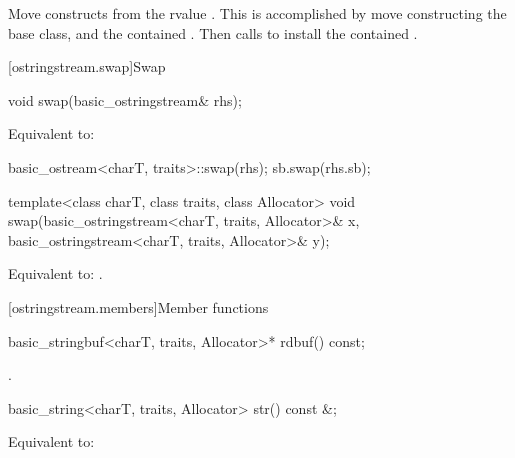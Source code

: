 \begin{itemdescr}
\pnum
\effects
Move constructs from the rvalue . This
is accomplished by move constructing the base class, and the contained
.
Then calls 
to install the contained .
\end{itemdescr}

[ostringstream.swap]{Swap}

%
\begin{itemdecl}
void swap(basic_ostringstream& rhs);
\end{itemdecl}

\begin{itemdescr}
\pnum
\effects
Equivalent to:
\begin{codeblock}
basic_ostream<charT, traits>::swap(rhs);
sb.swap(rhs.sb);
\end{codeblock}
\end{itemdescr}

%
\begin{itemdecl}
template<class charT, class traits, class Allocator>
  void swap(basic_ostringstream<charT, traits, Allocator>& x,
            basic_ostringstream<charT, traits, Allocator>& y);
\end{itemdecl}

\begin{itemdescr}
\pnum
\effects
Equivalent to: .
\end{itemdescr}

[ostringstream.members]{Member functions}

%
\begin{itemdecl}
basic_stringbuf<charT, traits, Allocator>* rdbuf() const;
\end{itemdecl}

\begin{itemdescr}
\pnum
\returns
{}.
\end{itemdescr}

%
\begin{itemdecl}
basic_string<charT, traits, Allocator> str() const &;
\end{itemdecl}

\begin{itemdescr}
\pnum
\effects
Equivalent to: 
\end{itemdescr}

